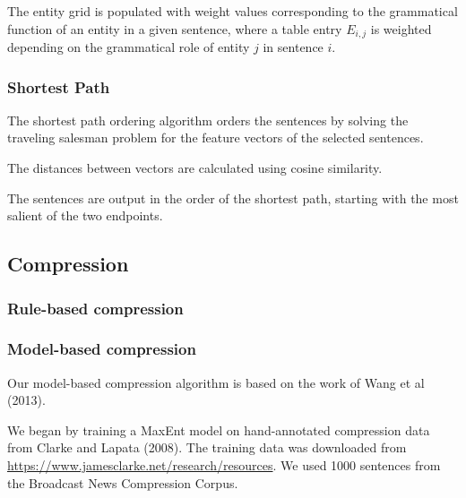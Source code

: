 \documentclass[11pt]{article}
\begin{document}
The entity grid is populated with weight values corresponding to the grammatical function of an entity in a given sentence, where a table entry $E_{i,j}$ is weighted depending on the grammatical role of entity $j$ in sentence $i$. 


\subsubsection{Shortest Path}
The shortest path ordering algorithm orders the sentences by solving the traveling salesman problem for the feature vectors of the selected sentences.

The distances between vectors are calculated using cosine similarity.

The sentences are output in the order of the shortest path, starting with the most salient of the two endpoints.

\subsection{Compression}

\subsubsection{Rule-based compression}

\subsubsection{Model-based compression}

Our model-based compression algorithm is based on the work of Wang et al (2013).

We began by training a MaxEnt model on hand-annotated compression data from Clarke and Lapata (2008). The training data was downloaded from \url{https://www.jamesclarke.net/research/resources}. We used 1000 sentences from the Broadcast News Compression Corpus.
\end{document}
